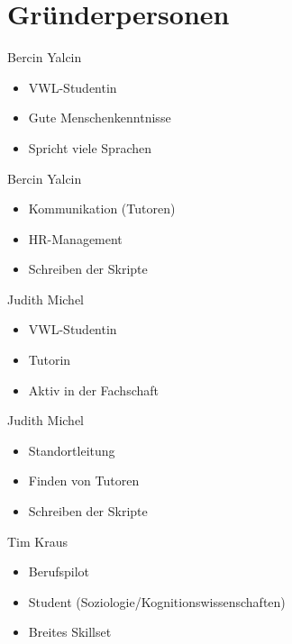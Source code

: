 \section{Gründerpersonen}


\begin{frame}[c]{Bercin Yalcin}
    \begin{itemize}[<+(1)->]
    \item VWL-Studentin
    \item Gute Menschenkenntnisse
    \item Spricht viele Sprachen
    \end{itemize}
\end{frame}

\begin{frame}[c]{Bercin Yalcin}
    \begin{itemize}[<+(1)->]
    \item Kommunikation (Tutoren)
    \item HR-Management
    \item Schreiben der Skripte
    \end{itemize}
\end{frame}

\begin{frame}[c]{Judith Michel}
    \begin{itemize}[<+(1)->]
    \item VWL-Studentin
    \item Tutorin
    \item Aktiv in der Fachschaft
    \end{itemize}
\end{frame}

\begin{frame}[c]{Judith Michel}
    \begin{itemize}[<+(1)->]
    \item Standortleitung
    \item Finden von Tutoren
    \item Schreiben der Skripte
    \end{itemize}
\end{frame}


\begin{frame}[c]{Tim Kraus}
    \begin{itemize}[<+(1)->]
    \item Berufspilot
    \item Student (Soziologie/Kognitionswissenschaften)
    \item Breites Skillset
    \end{itemize}
\end{frame}

